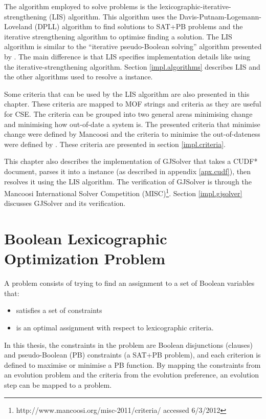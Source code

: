 The algorithm employed to solve \modelimpl problems is the lexicographic-iterative-strengthening (LIS) algorithm.
This algorithm uses the Davis-Putnam-Logemann-Loveland (DPLL) \citep{Davis1960, davis1962machine} algorithm to find solutions to SAT+PB problems
and the iterative strengthening \citep{calistri1994iterative, le2010sat4j} algorithm to optimise finding a solution.
The LIS algorithm is similar to the ``iterative pseudo-Boolean solving'' algorithm presented by \cite{marque2011blex}.
The main difference is that LIS specifies implementation details like using the iterative-strengthening algorithm.
Section \ref{impl.algorithms} describes LIS and the other algorithms used to resolve a \modelname instance.

Some criteria that can be used by the LIS algorithm are also presented in this chapter. 
These criteria are mapped to MOF strings and \modelname criteria as they are useful for CSE.
The criteria can be grouped into two general areas minimising change and minimising how out-of-date a system is.
The presented criteria that minimise change were defined by Mancoosi and the criteria to minimise the out-of-dateness were defined by \cite{leBerre2010}.
These criteria are presented in section \ref{impl.criteria}.

This chapter also describes the implementation of GJSolver that takes a CUDF* document, parses it into a \modelname instance (as described in appendix \ref{apx.cudf}),
then resolves it using the LIS algorithm.
The verification of GJSolver is through the Mancoosi International Solver Competition (MISC)\footnote{http://www.mancoosi.org/misc-2011/criteria/ accessed 6/3/2012}.
Section \ref{impl.gjsolver} discusses GJSolver and its verification.

\section{Boolean Lexicographic Optimization Problem}
\label{impl.mapping}
A \modelimpl problem consists of trying to find an assignment to a set of Boolean variables that:
\begin{itemize}
  \item satisfies a set of constraints
  \item is an optimal assignment with respect to lexicographic criteria.
\end{itemize}
In this thesis, the constraints in the \modelimpl problem are Boolean disjunctions (clauses) and pseudo-Boolean (PB) constraints (a SAT+PB problem),
and each criterion is defined to maximise or minimise a PB function.
By mapping the constraints from an evolution problem and the criteria from the evolution preference,
an evolution step can be mapped to a \modelimpl problem.


